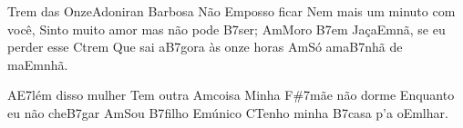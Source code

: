 \begin{musica}{Trem das Onze}{Adoniran Barbosa}{}
Não \ac{Em}{po}sso ficar
Nem mais um minuto com você,
Sinto muito amor mas não pode \ac{B7}{ser};
\ac{Am}{Mo}ro \ac{B7}{em} Jaça\ac{Em}{nã}, se eu perder esse \ac{C}{trem}
Que sai a\ac{B7}{go}ra às onze horas
\ac{Am}{Só} ama\ac{B7}{nhã} de ma\ac{Em}{nhã}.

A\ac{E7}{lém} disso mulher
Tem outra \ac{Am}{coi}sa
Minha \ac{F#7}{mãe} não dorme
Enquanto eu não che\ac{B7}{gar}
\ac{Am}{Sou} \ac{B7}{fi}lho \ac{Em}{ú}nico
\ac{C}{Te}nho minha \ac{B7}{ca}sa p’a o\ac{Em}{lhar}.


\end{musica}
